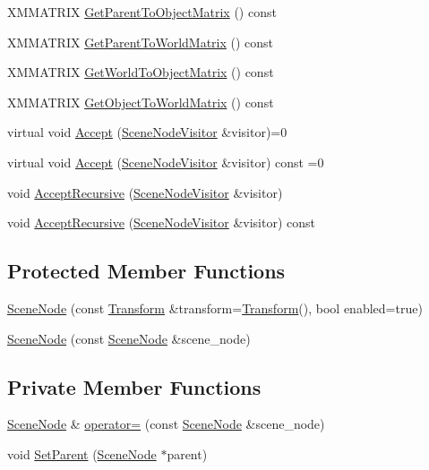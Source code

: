 \begin{DoxyCompactItemize}
X\+M\+M\+A\+T\+R\+IX \hyperlink{classmage_1_1_scene_node_a5ec8b0d2e5ba7873842c0fa65e1248bb}{Get\+Parent\+To\+Object\+Matrix} () const
\item 
X\+M\+M\+A\+T\+R\+IX \hyperlink{classmage_1_1_scene_node_afb199589e809c3cb0e46a691a737e5da}{Get\+Parent\+To\+World\+Matrix} () const
\item 
X\+M\+M\+A\+T\+R\+IX \hyperlink{classmage_1_1_scene_node_a0ddba0d70a8b2ce0ef80f25673d0dd56}{Get\+World\+To\+Object\+Matrix} () const
\item 
X\+M\+M\+A\+T\+R\+IX \hyperlink{classmage_1_1_scene_node_a4325660d42f5f393c77389a44aedb5cb}{Get\+Object\+To\+World\+Matrix} () const
\item 
virtual void \hyperlink{classmage_1_1_scene_node_a32ed8763c8f8b4caa155f64551d96f13}{Accept} (\hyperlink{classmage_1_1_scene_node_visitor}{Scene\+Node\+Visitor} \&visitor)=0
\item 
virtual void \hyperlink{classmage_1_1_scene_node_a35fbfd49185fb61cb4e9edf56af35262}{Accept} (\hyperlink{classmage_1_1_scene_node_visitor}{Scene\+Node\+Visitor} \&visitor) const =0
\item 
void \hyperlink{classmage_1_1_scene_node_a87f53bc4edcbfcd9cf7c2390c4a99ae4}{Accept\+Recursive} (\hyperlink{classmage_1_1_scene_node_visitor}{Scene\+Node\+Visitor} \&visitor)
\item 
void \hyperlink{classmage_1_1_scene_node_a3463a687f049dac387500a6ace5f62e7}{Accept\+Recursive} (\hyperlink{classmage_1_1_scene_node_visitor}{Scene\+Node\+Visitor} \&visitor) const
\end{DoxyCompactItemize}
\subsection*{Protected Member Functions}
\begin{DoxyCompactItemize}
\item 
\hyperlink{classmage_1_1_scene_node_a3cf69b4acd80f1e4452e603e9c713cbf}{Scene\+Node} (const \hyperlink{structmage_1_1_transform}{Transform} \&transform=\hyperlink{structmage_1_1_transform}{Transform}(), bool enabled=true)
\item 
\hyperlink{classmage_1_1_scene_node_a0259a6b573eb633b589cd986b9ec6734}{Scene\+Node} (const \hyperlink{classmage_1_1_scene_node}{Scene\+Node} \&scene\+\_\+node)
\end{DoxyCompactItemize}
\subsection*{Private Member Functions}
\begin{DoxyCompactItemize}
\item 
\hyperlink{classmage_1_1_scene_node}{Scene\+Node} \& \hyperlink{classmage_1_1_scene_node_a37becece66e7d801e34bd6cacd0e83f2}{operator=} (const \hyperlink{classmage_1_1_scene_node}{Scene\+Node} \&scene\+\_\+node)
\item 
void \hyperlink{classmage_1_1_scene_node_a27d5219ff4c1f2b1c37899456af518ae}{Set\+Parent} (\hyperlink{classmage_1_1_scene_node}{Scene\+Node} $\ast$parent)
\end{DoxyCompactItemize}
